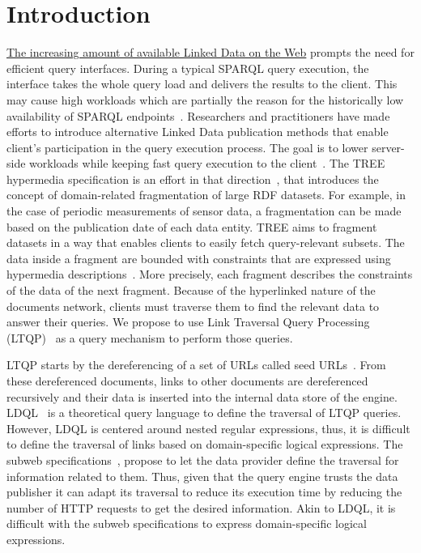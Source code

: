 \section{Introduction}



\href{https://lod-cloud.net/#diagram}{The increasing amount of available Linked Data on the Web} prompts the need for efficient query interfaces.
During a typical SPARQL query execution, the interface takes the whole query load and delivers the results to the client.
This may cause high workloads which are partially the reason for the historically low availability of SPARQL endpoints~\cite{aranda2013}.
Researchers and practitioners have made efforts to introduce alternative Linked Data publication methods that enable client's participation in the query execution process.
The goal is to lower server-side workloads while keeping fast query execution to the client~\cite{Azzam2021}.
The TREE hypermedia specification is an effort in that direction~\cite{ColpaertMaterializedTREE, lancker2021LDS}, that introduces the concept of domain-related fragmentation of large RDF datasets.
For example, in the case of periodic measurements of sensor data, a fragmentation can be made based on the publication date of each data entity.
TREE aims to fragment datasets in a way that enables clients to easily fetch query-relevant subsets.
The data inside a fragment are bounded with constraints that are expressed using hypermedia descriptions~\cite{thomasFieldingPhdThesis}.
More precisely, each fragment describes the constraints of the data of the next fragment.
Because of the hyperlinked nature of the documents network, clients must traverse them to find the relevant data to answer their queries.
We propose to use Link Traversal Query Processing (LTQP)~\cite{Hartig2016} as a query mechanism to perform those queries.

LTQP starts by the dereferencing of a set of URLs called seed URLs~\cite{Hartig2016}.
From these dereferenced documents, links to other documents are dereferenced recursively and their data is inserted into the internal data store of the engine.
LDQL~\cite{hartig2016Ldql} is a theoretical query language to define the traversal of LTQP queries.
However, LDQL is centered around nested regular expressions, thus, it is difficult to define the traversal of links based on domain-specific logical expressions.
The subweb specifications~\cite{bogaerts_rulemlrr_2021}, propose to let the data provider define the traversal for information related to them.
Thus, given that the query engine trusts the data publisher it can adapt its traversal to reduce its execution time by reducing the number of HTTP requests to get the desired information.
Akin to LDQL, it is difficult with the subweb specifications to express domain-specific logical expressions.

